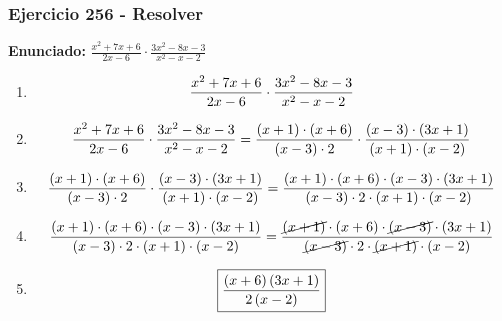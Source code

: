 \documentclass[11pt,a4paper]{article}
\newcommand{\fitmath}[1]{%
\[
\setbox0=\hbox{$\displaystyle #1$}%
\ifdim\wd0>\linewidth
\resizebox{\linewidth}{!}{$\displaystyle #1$}%
\else
#1%
\fi
\]
}
\begin{document}
\subsubsection*{Ejercicio 256 - Resolver}
\textbf{Enunciado:} $ \frac{x^{2} + 7 x + 6}{2 x - 6} \cdot \frac{3 x^{2} - 8 x - 3}{x^{2} - x - 2} $\par
\begin{enumerate}[leftmargin=2em]
\item \fitmath{\frac{x^{2} + 7 x + 6}{2 x - 6} \cdot \frac{3 x^{2} - 8 x - 3}{x^{2} - x - 2}}
\item \fitmath{\frac{x^{2} + 7 x + 6}{2 x - 6} \cdot \frac{3 x^{2} - 8 x - 3}{x^{2} - x - 2}= \frac{\left(x + 1\right)\cdot \left(x + 6\right)}{\left(x - 3\right)\cdot 2} \cdot \frac{\left(x - 3\right)\cdot \left(3 x + 1\right)}{\left(x + 1\right)\cdot \left(x - 2\right)}}
\item \fitmath{\frac{\left(x + 1\right)\cdot \left(x + 6\right)}{\left(x - 3\right)\cdot 2}\cdot \frac{\left(x - 3\right)\cdot \left(3 x + 1\right)}{\left(x + 1\right)\cdot \left(x - 2\right)}= \frac{\left(x + 1\right)\cdot \left(x + 6\right)\cdot \left(x - 3\right)\cdot \left(3 x + 1\right)}{\left(x - 3\right)\cdot 2\cdot \left(x + 1\right)\cdot \left(x - 2\right)}}
\item \fitmath{\frac{\left(x + 1\right)\cdot \left(x + 6\right)\cdot \left(x - 3\right)\cdot \left(3 x + 1\right)}{\left(x - 3\right)\cdot 2\cdot \left(x + 1\right)\cdot \left(x - 2\right)}= \frac{\cancel{\left(x + 1\right)}\cdot \left(x + 6\right)\cdot \cancel{\left(x - 3\right)}\cdot \left(3 x + 1\right)}{\cancel{\left(x - 3\right)}\cdot 2\cdot \cancel{\left(x + 1\right)}\cdot \left(x - 2\right)}}
\item \fitmath{\boxed{\frac{\left(x + 6\right) \left(3 x + 1\right)}{2 \left(x - 2\right)}}}
\end{enumerate}

\vspace{0.12cm}
\end{document}
